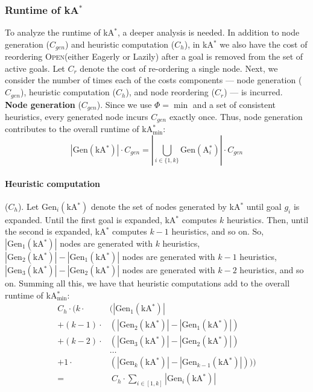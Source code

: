 \documentclass[smallextended]{svjour3}       %
\newcommand{\kastar}{kA$^*$\xspace}
\newcommand{\kastarvar}[1]{\textup{kA}$^*_{#1}$\xspace}
\newcommand{\kastarmin}{\kastarvar{\min}}
\newcommand{\astari}[1]{A$^*_{#1}$\xspace}
\newcommand{\Gen}{\text{Gen}}
\newcommand{\open}{\textsc{Open}\xspace}
\begin{document}
\subsubsection{Runtime of \kastar}

To analyze the runtime of \kastar, a deeper analysis is needed.
In addition to node generation ($C_{gen}$) and heuristic computation ($C_h$), in \kastar we also have the cost of reordering \open (either Eagerly or Lazily) after a goal is removed from the set of active goals. Let $C_r$ denote the cost of re-ordering a single node. 
Next, we consider the number of times each of the costs components --- node generation ($C_{gen}$), heuristic computation ($C_h$), and node reordering ($C_r$) --- is incurred.\\

\noindent \textbf{Node generation} ($C_{gen}$).
Since we use $\Phi=\min$ and a set of consistent heuristics, every generated node incurs $C_{gen}$ exactly once.
Thus, node generation contributes to the overall runtime of \kastarmin:
\[
|\Gen(\text{\kastar})|\cdot C_{gen} = |\bigcup_{i\in{\{1,k\}}} \Gen(\text{\astari{i}})|\cdot C_{gen}
\]
\paragraph{Heuristic computation} ($C_{h}$).
Let $\Gen_i(\text{\kastar})$ denote the set of nodes generated by \kastar until goal $g_i$ is expanded.
Until the first goal is expanded, \kastar computes $k$ heuristics.
Then, until the second is expanded, \kastar computes $k-1$ heuristics, and so on.
So, $|\Gen_1(\text{\kastar})|$ nodes are generated with $k$ heuristics, $|\Gen_2(\text{\kastar})|-|\Gen_1(\text{\kastar})|$ nodes are generated with $k-1$ heuristics, $|\Gen_3(\text{\kastar})|-|\Gen_2(\text{\kastar})|$ nodes are generated with $k-2$ heuristics, and so on.
Summing all this, we have that heuristic computations add to the overall runtime of \kastarmin:
\begin{align*}
  C_h\cdot ( k \cdot & (|\Gen_1(\text{\kastar})| \\
   + (k-1) \cdot&(|\Gen_2(\text{\kastar})|-|\Gen_1(\text{\kastar})|)\\
   + (k-2) \cdot&(|\Gen_3(\text{\kastar})|-|\Gen_2(\text{\kastar})|) \\
   &\ldots\\
   + 1 \cdot&(|\Gen_k(\text{\kastar})|-|\Gen_{k-1}(\text{\kastar})|)))\\
   =& ~ C_h \cdot \sum_{i\in[1,k]} |\Gen_i(\text{\kastar})|
\end{align*}
\end{document}
